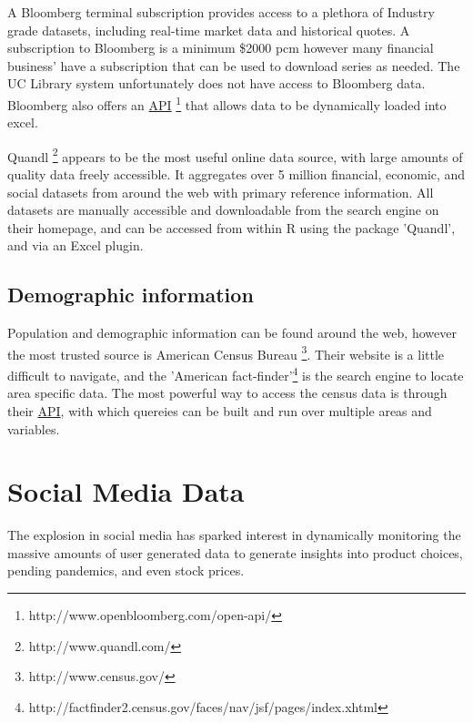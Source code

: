 \documentclass[11pt]{article}
\begin{document}
	A Bloomberg terminal subscription provides access to a plethora of Industry grade datasets, including real-time market data and historical quotes.
	A subscription to Bloomberg is a minimum \$2000 pcm however many financial business' have a subscription that can be used to download series as needed.
	The UC Library system unfortunately does not have access to Bloomberg data.
	Bloomberg also offers an \hyperref[api]{API} \footnote{http://www.openbloomberg.com/open-api/} that allows data to be dynamically loaded into excel.

	Quandl \footnote{http://www.quandl.com/} appears to be the most useful online data source, with large amounts of quality data freely accessible.
	It aggregates over 5 million financial, economic, and social datasets from around the web with primary reference information.
	All datasets are manually accessible and downloadable from the search engine on their homepage, and can be accessed from within R using the package 'Quandl', and via an Excel plugin. 

	
	\subsection{Demographic information}

	Population and demographic information can be found around the web, however the most trusted source is American Census Bureau \footnote{http://www.census.gov/}.
	Their website is a little difficult to navigate, and the 'American fact-finder'\footnote{http://factfinder2.census.gov/faces/nav/jsf/pages/index.xhtml} is the search engine to locate area specific data.
	The most powerful way to access the census data is through their \hyperref[api]{API}, with which quereies can be built and run over multiple areas and variables.


	\section{Social Media Data}
	The explosion in social media has sparked interest in dynamically monitoring the massive amounts of user generated data to generate insights into product choices, pending pandemics, and even stock prices.
\end{document}
